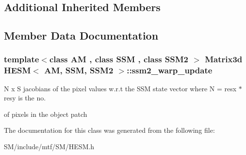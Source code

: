 \subsection*{Additional Inherited Members}


\subsection{Member Data Documentation}
\hypertarget{classHESM_a2528f05cea5cc5c9485a5b31a9b6d092}{
\subsubsection[{ssm2\-\_\-warp\-\_\-update}]{\setlength{\rightskip}{0pt plus 5cm}template$<$class A\-M , class S\-S\-M , class S\-S\-M2 $>$ Matrix3d {\bf H\-E\-S\-M}$<$ A\-M, S\-S\-M, S\-S\-M2 $>$\-::ssm2\-\_\-warp\-\_\-update}}\label{classHESM_a2528f05cea5cc5c9485a5b31a9b6d092}


N x S jacobians of the pixel values w.\-r.\-t the S\-S\-M state vector where N = resx $\ast$ resy is the no. 

of pixels in the object patch 

The documentation for this class was generated from the following file\-:\begin{DoxyCompactItemize}
\item 
S\-M/include/mtf/\-S\-M/H\-E\-S\-M.\-h\end{DoxyCompactItemize}
